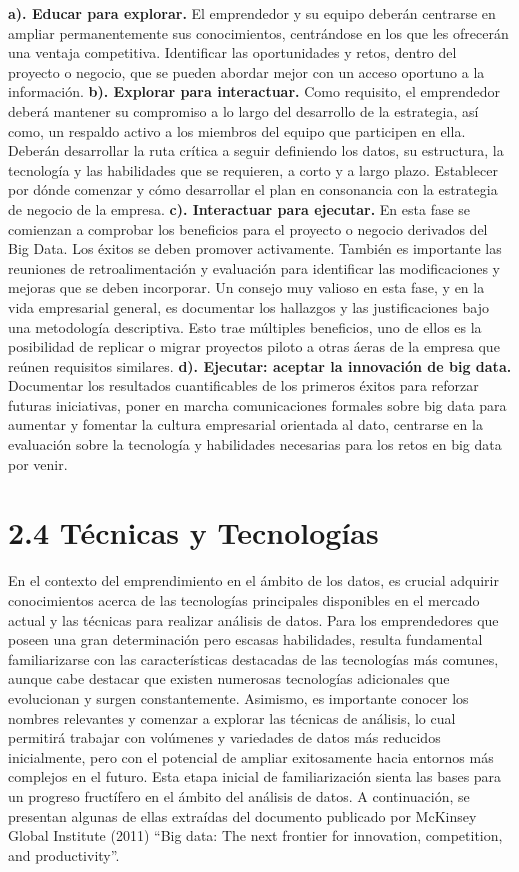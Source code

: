 \documentclass[
  letterpaper,
  DIV=11,
  numbers=noendperiod]{scrreprt}
\begin{document}
\textbf{a). Educar para explorar.} El emprendedor y su equipo deberán
centrarse en ampliar permanentemente sus conocimientos, centrándose en
los que les ofrecerán una ventaja competitiva. Identificar las
oportunidades y retos, dentro del proyecto o negocio, que se pueden
abordar mejor con un acceso oportuno a la información. \textbf{b).
Explorar para interactuar.} Como requisito, el emprendedor deberá
mantener su compromiso a lo largo del desarrollo de la estrategia, así
como, un respaldo activo a los miembros del equipo que participen en
ella. Deberán desarrollar la ruta crítica a seguir definiendo los datos,
su estructura, la tecnología y las habilidades que se requieren, a corto
y a largo plazo. Establecer por dónde comenzar y cómo desarrollar el
plan en consonancia con la estrategia de negocio de la empresa.
\textbf{c). Interactuar para ejecutar.} En esta fase se comienzan a
comprobar los beneficios para el proyecto o negocio derivados del Big
Data. Los éxitos se deben promover activamente. También es importante
las reuniones de retroalimentación y evaluación para identificar las
modificaciones y mejoras que se deben incorporar. Un consejo muy valioso
en esta fase, y en la vida empresarial general, es documentar los
hallazgos y las justificaciones bajo una metodología descriptiva. Esto
trae múltiples beneficios, uno de ellos es la posibilidad de replicar o
migrar proyectos piloto a otras áeras de la empresa que reúnen
requisitos similares. \textbf{d). Ejecutar: aceptar la innovación de big
data.} Documentar los resultados cuantificables de los primeros éxitos
para reforzar futuras iniciativas, poner en marcha comunicaciones
formales sobre big data para aumentar y fomentar la cultura empresarial
orientada al dato, centrarse en la evaluación sobre la tecnología y
habilidades necesarias para los retos en big data por venir.

\hypertarget{tuxe9cnicas-y-tecnologuxedas-1}{%
\section{2.4 Técnicas y
Tecnologías}\label{tuxe9cnicas-y-tecnologuxedas-1}}

En el contexto del emprendimiento en el ámbito de los datos, es crucial
adquirir conocimientos acerca de las tecnologías principales disponibles
en el mercado actual y las técnicas para realizar análisis de datos.
Para los emprendedores que poseen una gran determinación pero escasas
habilidades, resulta fundamental familiarizarse con las características
destacadas de las tecnologías más comunes, aunque cabe destacar que
existen numerosas tecnologías adicionales que evolucionan y surgen
constantemente. Asimismo, es importante conocer los nombres relevantes y
comenzar a explorar las técnicas de análisis, lo cual permitirá trabajar
con volúmenes y variedades de datos más reducidos inicialmente, pero con
el potencial de ampliar exitosamente hacia entornos más complejos en el
futuro. Esta etapa inicial de familiarización sienta las bases para un
progreso fructífero en el ámbito del análisis de datos. A continuación,
se presentan algunas de ellas extraídas del documento publicado por
McKinsey Global Institute (2011) ``Big data: The next frontier for
innovation, competition, and productivity''.
\end{document}
